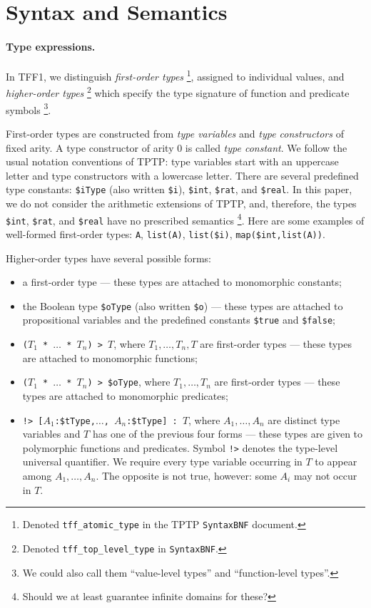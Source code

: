 \section{Syntax and Semantics} \label{sec_logic}

\paragraph{Type expressions.} In TFF1, we distinguish
{\em first-order types}%
\footnote{Denoted {\tt tff\_atomic\_type} in the
TPTP {\tt SyntaxBNF} document.}, assigned to individual values,
and {\em higher-order types}%
\footnote{Denoted {\tt tff\_top\_level\_type} in {\tt SyntaxBNF}.}
which specify the type signature of function and predicate symbols%
\footnote{We could also call them ``value-level types'' and
``function-level types''.}.

First-order types are constructed from {\em type variables\/}
and {\em type constructors\/} of fixed arity. A type constructor
of arity 0 is called {\em type constant}. We follow the usual
notation conventions of TPTP: type variables start with an
uppercase letter and type constructors with a lowercase letter.
There are several predefined type constants:
\verb+$iType+ (also written \verb+$i+),
\verb+$int+, \verb+$rat+, and \verb+$real+. In this paper,
we do not consider the arithmetic extensions of TPTP, and,
therefore, the types \verb+$int+, \verb+$rat+, and \verb+$real+
have no prescribed semantics%
\footnote{Should we at least guarantee infinite domains for these?}.
Here are some examples of well-formed first-order types:
\verb+A+, \verb+list(A)+, \verb+list($i)+, \verb+map($int,list(A))+.

Higher-order types have several possible forms:
\begin{itemize}
\item a first-order type --- these types are attached to
monomorphic constants;
\item the Boolean type \verb+$oType+ (also written \verb+$o+)
--- these types are attached to propositional variables and
the predefined constants \verb+$true+ and \verb+$false+;
\item {\tt ($T_1$ * $\dots$ * $T_n$) > $T$},
where $T_1,\dots,T_n,T$ are first-order types ---
these types are attached to monomorphic functions;
\item {\tt ($T_1$ * $\dots$ * $T_n$) > \$oType},
where $T_1,\dots,T_n$ are first-order types --- these types
are attached to monomorphic predicates;
\item {\tt !>~[$A_1$:\$tType,$\dots$,%
$A_n$:\$tType]~:~$T$}, where $A_1,\dots,A_n$ are distinct
type variables and $T$ has one of the previous four forms ---
these types are given to polymorphic functions and predicates.
Symbol {\tt !>} denotes the type-level universal quantifier.
We require every type variable occurring in $T$ to appear
among $A_1,\dots,A_n$. The opposite is not true, however:
some $A_i$ may not occur in $T$.
\end{itemize}

